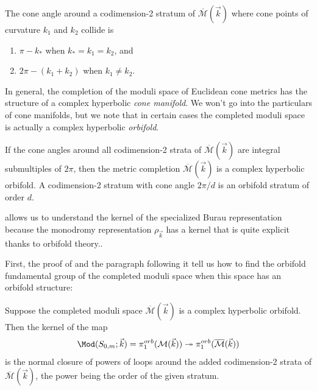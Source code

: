 \documentclass{amsart}
\begin{document}
    \begin{lemma} \label{lemma:cone_angles}
        The cone angle around a codimension-2 stratum of $\overline{\mathcal{M}}(\vec k)$ where cone points of curvature $k_1$ and $k_2$ collide is
        \begin{enumerate}
            \item $\pi-k_*$ when $k_*=k_1=k_2$, and
            \item $2\pi - (k_1+k_2)$ when $k_1 \ne k_2$.
        \end{enumerate}
    \end{lemma}
    
    In general, the completion of the moduli space of Euclidean cone metrics has the structure of a complex hyperbolic \textit{cone manifold}. We won't go into the particulars of cone manifolds, but we note that in certain cases the completed moduli space is actually a complex hyperbolic \textit{orbifold}.
    
    \begin{lemma} \label{lemma:orbifold_conditions}
        If the cone angles around all codimension-2 strata of $\overline{\mathcal M}(\vec k)$ are integral submultiples of $2\pi$, then the metric completion $\overline{\mathcal M}(\vec k)$ is a complex hyperbolic orbifold. A codimension-2 stratum with cone angle $2\pi/d$ is an orbifold stratum of order $d$.
    \end{lemma}

     allows us to understand the kernel of the specialized Burau representation because the monodromy representation $\rho_{\vec k}$ has a kernel that is quite explicit thanks to orbifold theory..
    
    First, the proof of \cite[Theorem 2.9]{Cooper2000Three-dimensionalCone-Manifolds} and the paragraph following it tell us how to find the orbifold fundamental group of the completed moduli space when this space has an orbifold structure:
    \begin{lemma}\label{lemma:completion_kernel}
        Suppose the completed moduli space $\overline{\mathcal{M}}(\vec k)$ is a complex hyperbolic orbifold. Then the kernel of the map
        $$\Mod(S_{0,m};\vec k) = \pi_1^{orb}(\mathcal{M}(\vec k)) \twoheadrightarrow \pi_1^{orb}(\overline{\mathcal{M}}(\vec k))$$
        is the normal closure of powers of loops around the added codimension-2 strata of $\overline{\mathcal M}(\vec k)$, the power being the order of the given stratum.
    \end{lemma}
\end{document}
